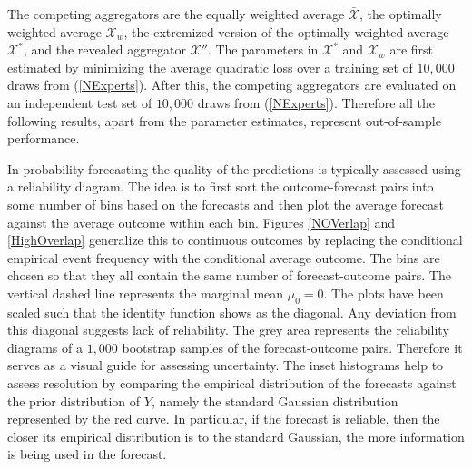 \documentclass[11pt]{article}
\theoremstyle{definition}
\theoremstyle{definition}
\begin{document}
The competing aggregators are the equally weighted average $\bar{\mathcal{X}}$, the optimally weighted average $\mathcal{X}_w$, the extremized version of the optimally weighted average $\mathcal{X}^*$, and the revealed aggregator $\mathcal{X}''$. The parameters in $\mathcal{X}^*$ and  $\mathcal{X}_w$ are first estimated by minimizing the average quadratic loss over a training set of $10,000$ draws from (\ref{NExperts}).  After this, the competing aggregators are evaluated on an independent test set of $10,000$ draws from (\ref{NExperts}). 
Therefore all the following results, apart from the parameter estimates, represent out-of-sample performance. 



In probability forecasting the quality of the predictions is typically assessed using a reliability diagram. The idea is to first sort the outcome-forecast pairs into some number of bins based on the forecasts and then plot the average forecast against the average outcome within each bin. Figures \ref{NOVerlap} and  \ref{HighOverlap}  generalize this to continuous outcomes by replacing the conditional empirical event frequency with the conditional average outcome. The bins are chosen so that they all contain the same number of forecast-outcome pairs. The vertical dashed line represents the marginal mean $\mu_0 = 0$.  The plots have been scaled such that the identity function shows as the diagonal. Any deviation from this diagonal suggests lack of reliability. The grey area represents the reliability diagrams of a $1,000$ bootstrap samples of the forecast-outcome pairs. Therefore it serves as a visual guide for assessing uncertainty. The inset histograms help to assess resolution by comparing the empirical distribution of the forecasts against the prior distribution of $Y$, namely the standard Gaussian distribution represented by the red curve. In particular, if the forecast is reliable, then the closer its empirical distribution is to the standard Gaussian, the more information is being used in the forecast. 
\end{document}
